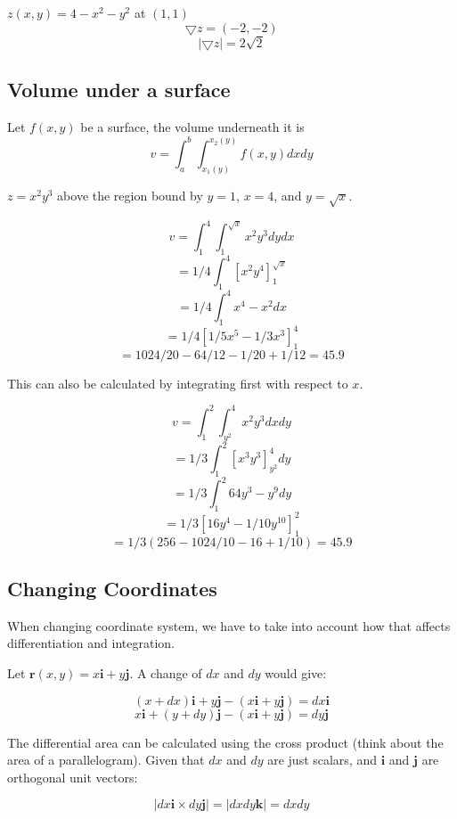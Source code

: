 \documentclass[a4paper,10pt]{article}
\begin{document}
\begin{ex}
	$z(x,y) = 4 - x^2 - y^2$ at $(1,1)$
	\[ \bigtriangledown z = (-2,-2) \]
	\[ |\bigtriangledown z| = 2\sqrt{2} \]
\end{ex}

\subsection{Volume under a surface}

Let $f(x,y)$ be a surface, the volume underneath it is
\[ v = \int_a^b \int_{x_1(y)}^{x_2(y)} f(x,y) dx dy \]

\begin{ex}
	$z = x^2y^3$ above the region bound by $y=1$, $x=4$, and $y=\sqrt{x}$.

	\[ v = \int_1^4 \int_1^{\sqrt{x}} x^2y^3 dy dx \]
	\[ = 1/4 \int_1^4 \left[ x^2y^4 \right]_1^{\sqrt{x}} \]
	\[ = 1/4 \int_1^4 x^4 - x^2 dx \]
	\[ = 1/4 \left[ 1/5 x^5 - 1/3 x^3 \right]_1^4 \]
	\[ = 1024/20 - 64/12 - 1/20 + 1/12 = 45.9 \]

	This can also be calculated by integrating first with respect to $x$.

	\[ v = \int_1^2 \int_{y^2}^4 x^2y^3 dxdy \]
	\[ = 1/3 \int_1^2 \left [x^3y^3 \right]_{y^2}^4 dy \]
	\[ = 1/3 \int_1^2 64y^3 - y^9 dy \]
	\[ = 1/3 \left[ 16y^4 - 1/10 y^10 \right]_1^2 \]
	\[ = 1/3 \left( 256 - 1024/10 - 16 + 1/10 \right) = 45.9 \]

\end{ex}

\subsection{Changing Coordinates}

When changing coordinate system, we have to take into account how that affects
differentiation and integration.

Let $\mathbf{r}(x,y) = x \mathbf{i} + y \mathbf{j}$. A change of $dx$ and $dy$
would give:

\[ (x + dx)\mathbf{i} + y\mathbf{j} - (x\mathbf{i} + y\mathbf{j}) =
dx\mathbf{i} \]
\[ x\mathbf{i} + (y + dy)\mathbf{j} - (x\mathbf{i} + y\mathbf{j}) =
dy\mathbf{j} \]

The differential area can be calculated using the cross product (think about
the area of a parallelogram). Given that $dx$ and $dy$ are just scalars, and
$\mathbf{i}$ and $\mathbf{j}$ are orthogonal unit vectors:

\[ |dx\mathbf{i} \times dy\mathbf{j}| = |dxdy\mathbf{k}| = dxdy \]
\end{document}
